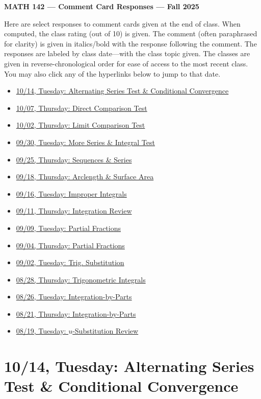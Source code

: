 \documentclass[11pt,letterpaper]{article}
\begin{document}
\begin{center} {\bfseries \LARGE MATH 142 --- Comment Card Responses --- Fall 2025} \end{center}

Here are select responses to comment cards given at the end of class. When computed, the class rating (out of 10) is given. The comment (often paraphrased for clarity) is given in italics/bold with the response following the comment. The responses are labeled by class date---with the class topic given. The classes are given in reverse-chronological order for ease of access to the most recent class. You may also click any of the hyperlinks below to jump to that date.

\begin{itemize}
\item \hyperref[10-14]{10/14, Tuesday: Alternating Series Test \& Conditional Convergence}
\item \hyperref[10-07]{10/07, Thursday: Direct Comparison Test}
\item \hyperref[10-02]{10/02, Thursday: Limit Comparison Test}
\item \hyperref[09-30]{09/30, Tuesday: More Series \& Integral Test}
\item \hyperref[09-25]{09/25, Thursday: Sequences \& Series}
\item \hyperref[09-18]{09/18, Thursday: Arclength \& Surface Area}
\item \hyperref[09-16]{09/16, Tuesday: Improper Integrals}
\item \hyperref[09-11]{09/11, Thursday: Integration Review}
\item \hyperref[09-09]{09/09, Tuesday: Partial Fractions}
\item \hyperref[09-04]{09/04, Thursday: Partial Fractions}
\item \hyperref[09-02]{09/02, Tuesday: Trig. Substitution}
\item \hyperref[08-28]{08/28, Thursday: Trigonometric Integrals}
\item \hyperref[08-26]{08/26, Tuesday: Integration-by-Parts}
\item \hyperref[08-21]{08/21, Thursday: Integration-by-Parts}
\item \hyperref[08-19]{08/19, Tuesday: $u$-Substitution Review}
\end{itemize}

\newpage
\section*{10/14, Tuesday: Alternating Series Test \& Conditional Convergence\label{10-14}}
\end{document}
